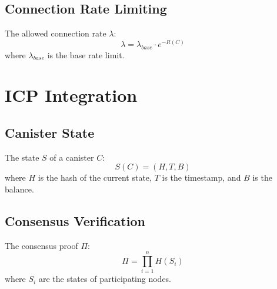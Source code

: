 \documentclass{article}
\begin{document}
\subsection{Connection Rate Limiting}
The allowed connection rate $\lambda$:
\begin{equation}
\lambda = \lambda_{base} \cdot e^{-R(C)}
\end{equation}
where $\lambda_{base}$ is the base rate limit.

\section{ICP Integration}

\subsection{Canister State}
The state $S$ of a canister $C$:
\begin{equation}
S(C) = (H, T, B)
\end{equation}
where $H$ is the hash of the current state, $T$ is the timestamp, and $B$ is the balance.

\subsection{Consensus Verification}
The consensus proof $\Pi$:
\begin{equation}
\Pi = \prod_{i=1}^{n} H(S_i)
\end{equation}
where $S_i$ are the states of participating nodes.
\end{document}
